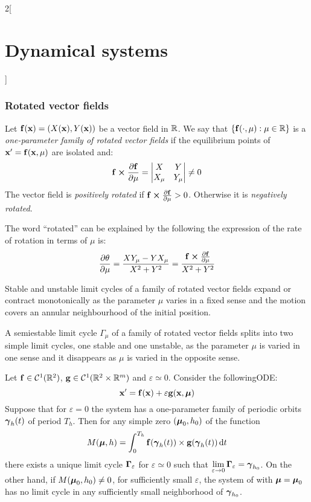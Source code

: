 \documentclass[../../../main_math.tex]{subfiles}
\begin{document}
\begin{multicols}{2}[\section{Dynamical systems}]
  \subsubsection{Rotated vector fields}
  \begin{definition}
    Let $\boldsymbol{\mathrm{f}}(\boldsymbol{\mathrm{x}})=(X(\boldsymbol{\mathrm{x}}),Y(\boldsymbol{\mathrm{x}}))$ be a vector field in $\mathbb{R}$. We say that $\{\boldsymbol{\mathrm{f}}(\cdot,\mu):\mu\in\mathbb{R}\}$ is a \emph{one-parameter family of rotated vector fields} if the equilibrium points of $\boldsymbol{\mathrm{x}}'=\boldsymbol{\mathrm{f}}(\boldsymbol{\mathrm{x}},\mu)$ are isolated and:
    $$\vf{f}\crossprod\pdv{\vf{f}}{\mu}=
      \begin{vmatrix}
        X     & Y     \\
        X_\mu & Y_\mu
      \end{vmatrix}\ne 0
    $$
    The vector field is \emph{positively rotated} if $\vf{f}\crossprod\pdv{\vf{f}}{\mu}>0$. Otherwise it is \emph{negatively rotated}.
  \end{definition}
  \begin{remark}
    The word ``rotated'' can be explained by the following the expression of the rate of rotation in terms of $\mu$ is:
    $$\pdv{\theta}{\mu}=\frac{XY_\mu-YX_\mu}{X^2+Y^2}=\frac{\vf{f}\crossprod\pdv{\vf{f}}{\mu}}{X^2+Y^2}$$
  \end{remark}
  \begin{theorem}
    Stable and unstable limit cycles of a family of rotated vector fields expand or contract monotonically as the parameter $\mu$ varies in a fixed sense and the motion covers an annular neighbourhood of the initial position.
  \end{theorem}
  \begin{theorem}
    A semiestable limit cycle $\Gamma_\mu$ of a family of rotated vector fields splits into two simple limit cycles, one stable and one unstable, as the parameter $\mu$ is varied in one sense and it disappears as $\mu$ is varied in the opposite sense.
  \end{theorem}
  \begin{theorem}
    Let $\boldsymbol{\mathrm{f}}\in\mathcal{C}^1(\mathbb{R}^2)$, $\boldsymbol{\mathrm{g}}\in\mathcal{C}^1(\mathbb{R}^2\times\mathbb{R}^m)$ and $\varepsilon\simeq 0$. Consider the followingODE:
    \begin{equation}\label{DS:melnikov}
      \boldsymbol{\mathrm{x}}'=\boldsymbol{\mathrm{f}}(\boldsymbol{\mathrm{x}})+\varepsilon\boldsymbol{\mathrm{g}}(\boldsymbol{\mathrm{x}},\boldsymbol{\mathrm{\mu}})
    \end{equation}
    Suppose that for $\varepsilon =0$ the system has a one-parameter family of periodic orbits $\boldsymbol{\mathrm{\gamma}}_h(t)$ of period $T_h$. Then for any simple zero $(\boldsymbol{\mathrm{\mu}}_0,h_0)$ of the function $$M(\boldsymbol{\mathrm{\mu}}, h)=\int_{0}^{T_h}\boldsymbol{\mathrm{f}}(\boldsymbol{\mathrm{\gamma}}_h(t))\times \boldsymbol{\mathrm{g}}(\boldsymbol{\mathrm{\gamma}}_h(t))\dd{t}$$ there exists a unique limit cycle $\boldsymbol{\mathrm{\Gamma}}_\varepsilon$ for $\varepsilon\simeq 0$ such that $\displaystyle\lim_{\varepsilon\to 0}\boldsymbol{\mathrm{\Gamma}}_\varepsilon=\boldsymbol{\mathrm{\gamma}}_{h_0}$. On the other hand, if $M(\boldsymbol{\mathrm{\mu}}_0,h_0)\ne 0$, for sufficiently small $\varepsilon$, the system of  with $\boldsymbol{\mathrm{\mu}}=\boldsymbol{\mathrm{\mu}}_0$ has no limit cycle in any sufficiently small neighborhood of $\boldsymbol{\mathrm{\gamma}}_{h_0}$.

\end{theorem}
\end{multicols}
\end{document}
